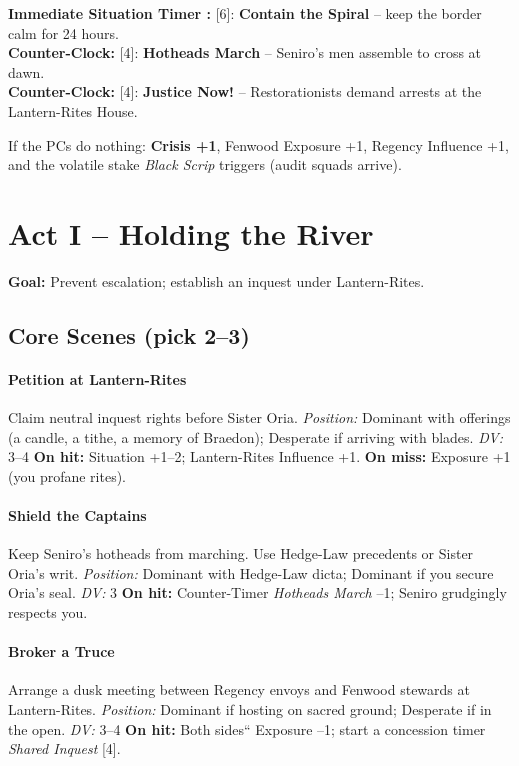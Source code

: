 \documentclass[11pt]{article}
\newcommand{\timer}[2]{\textbf{#1:} [#2]}
\newcommand{\position}[1]{\textit{Position:} #1}
\newcommand{\dv}[1]{\textit{DV:} #1}
\begin{document}
\timer{Immediate Situation Timer }{6}: \textbf{Contain the Spiral} -- keep the border calm for 24 hours. \\
\timer{Counter-Clock}{4}: \textbf{Hotheads March} -- Seniro's men assemble to cross at dawn. \\
\timer{Counter-Clock}{4}: \textbf{Justice Now!} -- Restorationists demand arrests at the Lantern-Rites House.

If the PCs do nothing: \textbf{Crisis +1}, Fenwood Exposure +1, Regency Influence +1, and the volatile stake \textit{Black Scrip} triggers (audit squads arrive).

\section*{Act I -- Holding the River}
\textbf{Goal:} Prevent escalation; establish an inquest under Lantern-Rites.

\subsection*{Core Scenes (pick 2--3)}

\paragraph{Petition at Lantern-Rites}
Claim neutral inquest rights before Sister Oria.  
\position{Dominant with offerings (a candle, a tithe, a memory of Braedon); Desperate if arriving with blades.} \dv{3--4}  
\textbf{On hit:} Situation +1--2; Lantern-Rites Influence +1.  
\textbf{On miss:} Exposure +1 (you profane rites).

\paragraph{Shield the Captains}
Keep Seniro's hotheads from marching. Use Hedge-Law precedents or Sister Oria's writ.  
\position{Dominant with Hedge-Law dicta; Dominant if you secure Oria's seal.} \dv{3}  
\textbf{On hit:} Counter-Timer \textit{Hotheads March} --1; Seniro grudgingly respects you.

\paragraph{Broker a Truce}
Arrange a dusk meeting between Regency envoys and Fenwood stewards at Lantern-Rites.  
\position{Dominant if hosting on sacred ground; Desperate if in the open.} \dv{3--4}  
\textbf{On hit:} Both sides`` Exposure --1; start a concession timer \textit{Shared Inquest} [4].
\end{document}
